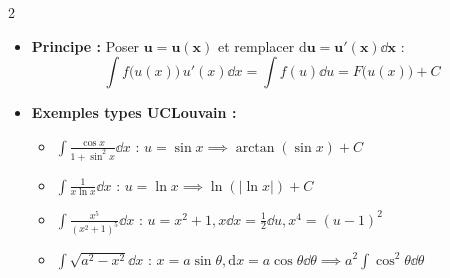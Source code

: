 {\begin{multicols}{2}
\vspace{3pt}
\begin{itemize}[leftmargin=1.2em, itemsep=1.5pt, topsep=2pt]
    \item \textbf{Principe :} Poser $\mathbf{u = u(x)}$ et remplacer $\mathbf{\mathrm{d}u = u'(x)\dd x}$ :
    \[
        \int f\bigl(u(x)\bigr)\,u'(x)\dd x = \int f(u)\dd u = F\bigl(u(x)\bigr) + C
    \]
    \item \textbf{Exemples types UCLouvain :}
    \begin{itemize}[leftmargin=1em, itemsep=1pt, topsep=1pt]
        \item $\int \frac{\cos x}{1+\sin^2 x}\dd x$ : $u = \sin x \implies \arctan(\sin x) + C$
        \item $\int \frac{1}{x\ln x}\dd x$ : $u = \ln x \implies \ln(|\ln x|) + C$
        \item $\int \frac{x^5}{(x^2+1)^5}\dd x$ : $u = x^2+1, x\dd x = \frac{1}{2}\dd u, x^4 = (u-1)^2$
        \item $\int \sqrt{a^2 - x^2}\dd x$ : $x = a\sin\theta, \mathrm{d}x = a\cos\theta\dd\theta \implies a^2\int \cos^2\theta\dd\theta$
    \end{itemize}
\end{itemize}

\columnbreak


\end{multicols}}
